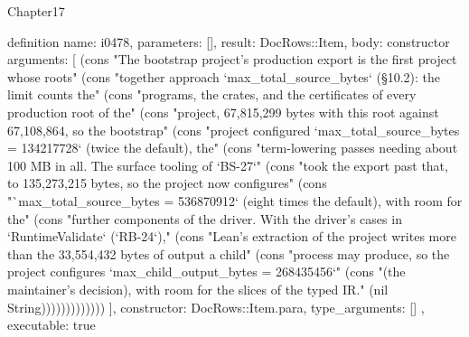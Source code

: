 \begin{lexlean}{Chapter17}
\begin{semanticmodule}
definition{
  name: i0478,
  parameters: [],
  result: DocRows::Item,
  body: constructor{
    arguments: [
      (cons "The bootstrap project's production export is the first project whose roots" (cons "together approach `max_total_source_bytes` (§10.2): the limit counts the" (cons "programs, the crates, and the certificates of every production root of the" (cons "project, 67,815,299 bytes with this root against 67,108,864, so the bootstrap" (cons "project configured `max_total_source_bytes = 134217728` (twice the default), the" (cons "term-lowering passes needing about 100 MB in all. The surface tooling of `BS-27`" (cons "took the export past that, to 135,273,215 bytes, so the project now configures" (cons "`max_total_source_bytes = 536870912` (eight times the default), with room for the" (cons "further components of the driver. With the driver's cases in `RuntimeValidate` (`RB-24`)," (cons "Lean's extraction of the project writes more than the 33,554,432 bytes of output a child" (cons "process may produce, so the project configures `max_child_output_bytes = 268435456`" (cons "(the maintainer's decision), with room for the slices of the typed IR." (nil String)))))))))))))
    ],
    constructor: DocRows::Item.para,
    type_arguments: []
  },
  executable: true
}


\end{semanticmodule}
\end{lexlean}
